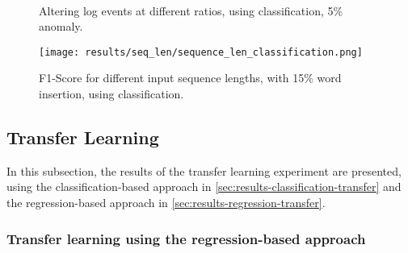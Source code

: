 \begin{figure*}[ht!]
\hspace{\fill}
\hspace{\fill}
   \\
\caption{\label{fig:results_multiclass_qualitative}Altering log events at different ratios, using classification, 5\% anomaly.}
\end{figure*}

\begin{figure}[h]
  \centering
  \texttt{[image: results/seq\_len/sequence\_len\_classification.png]}\\
  \caption{F1-Score for different input sequence lengths, with 15\% word insertion, using classification.}
  \label{fig:seq_len_classification}
\end{figure}



\subsection{Transfer Learning\label{sec:results_transfer}}
In this subsection, the results of the transfer learning experiment are presented, using the classification-based approach in \ref{sec:results-classification-transfer} and the regression-based approach in \ref{sec:results-regression-transfer}.


\subsubsection{Transfer learning using the regression-based approach \label{sec:results-regression-transfer}}

